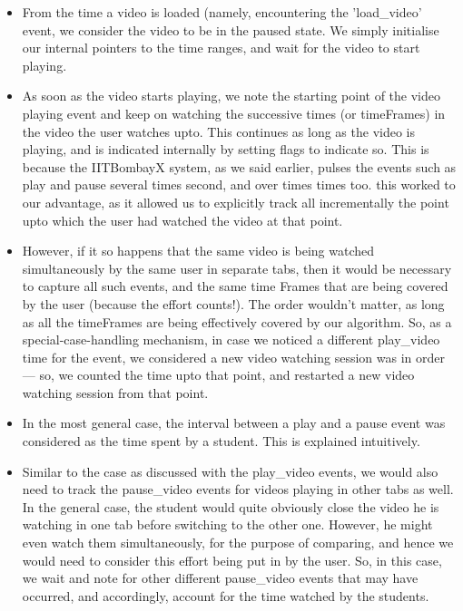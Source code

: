 \documentclass[16pt]{report}
\begin{document}
\begin{itemize}

\item From the time a video is loaded (namely, encountering the 'load\_video' event, we consider the video to be in the paused state. We simply initialise our internal pointers to the time ranges, and wait for the video to start playing.

\item As soon as the video starts playing, we note the starting point of the video playing event and keep on watching the successive times (or timeFrames) in the video the user watches upto. This continues as long as the video is playing, and is indicated internally by setting flags to indicate so. This is because the IITBombayX system, as we said earlier, pulses the events such as play and pause several times second, and over times times too. this worked to our advantage, as it allowed us to explicitly track all incrementally the point upto which the user had watched the video at that point.

\item However, if it so happens that the same video is being watched simultaneously by the same user in separate tabs, then it would be necessary to capture all such events, and the same time Frames that are being covered by the user (because the effort counts!). The order wouldn't matter, as long as all the timeFrames are being effectively covered by our algorithm. So, as a special-case-handling mechanism, in case we noticed a different play\_video time for the event, we considered a new video watching session was in order --- so, we counted the time upto that point, and restarted a new video watching session from that point.	

\item In the most general case, the interval between a play and a pause event was considered as the time spent by a student. This is explained intuitively.

\item Similar to the case as discussed with the play\_video events, we would also need to track the pause\_video events for videos playing in other tabs as well. In the general case, the student would quite obviously close the video he is watching in one tab before switching to the other one. However, he might even watch them simultaneously, for the purpose of comparing, and hence we would need to consider this effort being put in by the user. So, in this case, we wait and note for other different pause\_video events that may have occurred, and accordingly, account for the time watched by the students. 


\end{itemize}
\end{document}
